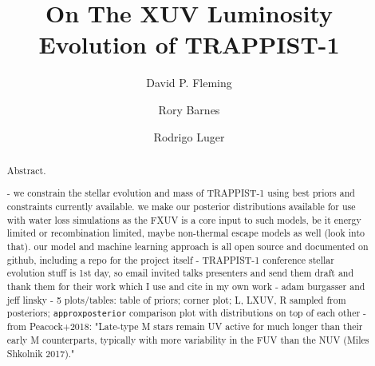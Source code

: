 \documentclass[twocolumn]{aastex62}
\newcommand{\approxposterior}[0]{\texttt{approxposterior}\xspace}
\begin{document}
\title{On The XUV Luminosity Evolution of TRAPPIST-1}



\author{David P. Fleming}

\author{Rory Barnes}

\author{Rodrigo Luger}


\begin{abstract}

Abstract.

- we constrain the stellar evolution and mass of TRAPPIST-1 using best priors and constraints currently available. we make our posterior distributions available for use with water loss simulations as the FXUV is a core input to such models, be it energy limited or recombination limited, maybe non-thermal escape models as well (look into that). our model and machine learning approach is all open source and documented on github, including a repo for the project itself
- TRAPPIST-1 conference stellar evolution stuff is 1st day, so email invited talks presenters and send them draft and thank them for their work which I use and cite in my own work - adam burgasser and jeff linsky
- 5 plots/tables: table of priors; corner plot; L, LXUV, R sampled from posteriors; \approxposterior comparison plot with distributions on top of each other 
- from Peacock+2018: "Late-type M stars remain UV active for much longer than their early M counterparts, typically with more variability in the FUV than the NUV (Miles Shkolnik 2017)."

\end{abstract}


\keywords{}
\end{document}
